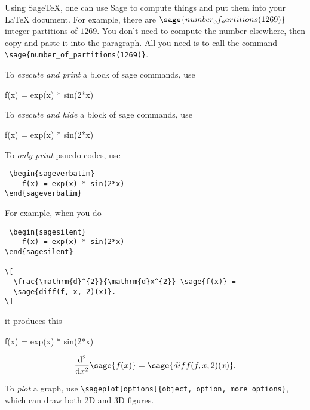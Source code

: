 \documentclass{amsart}
\begin{document}
Using Sage\TeX, one can use Sage to compute things and put them into
your \LaTeX{} document. For example, there are
$\sage{number_of_partitions(1269)}$ integer partitions of $1269$.
You don't need to compute the number elsewhere, then copy and paste
it into the paragraph. All you need is to call the command {\color{red}\verb|\sage{number_of_partitions(1269)}|}.
  
  
 To {\em execute and print} a block of sage commands, use
 {\color{red}
 \begin{sageverbatim}
 \begin{sageblock}
    f(x) = exp(x) * sin(2*x)
\end{sageblock}
 \end{sageverbatim}
}

To {\em execute and hide} a block of sage commands, use 
 {\color{red}
 \begin{sageverbatim}
 \begin{sagesilent}
    f(x) = exp(x) * sin(2*x)
\end{sagesilent}
 \end{sageverbatim}
}

To {\em only print} psuedo-codes, use
{\color{red}
 \begin{verbatim}
 \begin{sageverbatim}
    f(x) = exp(x) * sin(2*x)
\end{sageverbatim}
 \end{verbatim}
}

\begin{framed}
For example, when you do 
 
 {\color{red}
 \begin{verbatim}
 \begin{sagesilent}
    f(x) = exp(x) * sin(2*x)
\end{sagesilent}

\[
  \frac{\mathrm{d}^{2}}{\mathrm{d}x^{2}} \sage{f(x)} =
  \sage{diff(f, x, 2)(x)}.
\]
\end{verbatim}
}
it produces this
 \begin{sagesilent}
    f(x) = exp(x) * sin(2*x)
\end{sagesilent}
\[
  \frac{\mathrm{d}^{2}}{\mathrm{d}x^{2}} \sage{f(x)} =
  \sage{diff(f, x, 2)(x)}.
\]

\end{framed}
To {\em plot} a graph, use {\color{red}\verb|\sageplot[options]{object, option, more options}|}, which can draw both 2D and 3D figures. 
\end{document}
